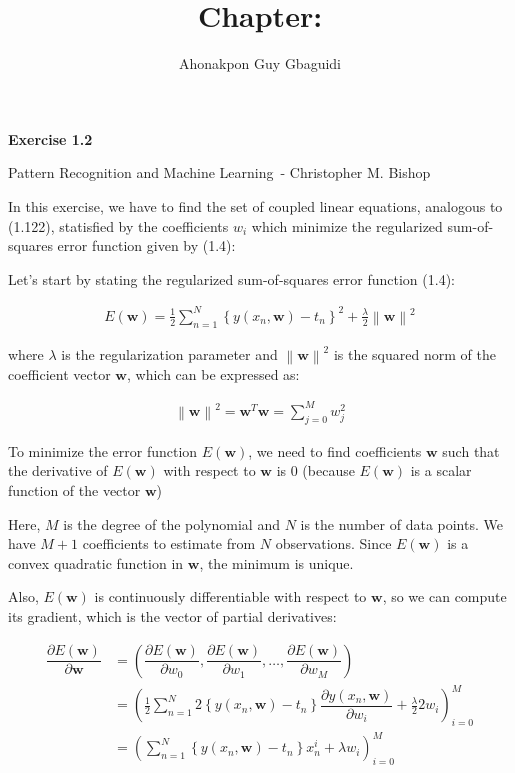\documentclass{article}
\title{Chapter: \ChapterName}
\author{Ahonakpon Guy Gbaguidi}
\date{}
\newcommand{\BookName}{Pattern Recognition and Machine Learning}
\newcommand{\BookAuthor}{Christopher M. Bishop}
\newcommand{\ExerciseID}{1.2}
\begin{document}
\maketitle

\begin{center}
  \large\textbf{Exercise \ExerciseID}

  \vspace{0.5em}

  \normalsize\BookName\ - \BookAuthor
\end{center}

\begin{tcolorbox}[breakable,colback=gray!5,colframe=gray!60,title=Solution]
In this exercise, we have to find the set of coupled linear equations, analogous
to (1.122), statisfied by the coefficients $w_i$ which minimize the regularized sum-of-squares error function given by (1.4):

Let's start by stating the regularized sum-of-squares error function (1.4):

\begin{align*}
  E(\textbf{w}) = \frac{1}{2} \sum_{n=1}^N \left\{ y(x_n, \textbf{w}) - t_n \right\}^2 + \frac{\lambda}{2} \left\lVert \textbf{w} \right\rVert^2
\end{align*}

where $\lambda$ is the regularization parameter and $\left\lVert \textbf{w} \right\rVert^2$ is the squared norm of the coefficient vector $\textbf{w}$, which can be expressed as:

\begin{align*}
  \left\lVert \textbf{w} \right\rVert^2 = \textbf{w}^T \textbf{w} = \sum_{j=0}^M w_j^2
\end{align*}

To minimize the error function $E(\textbf{w})$, we need to find coefficients $\textbf{w}$ such that the derivative of $E(\textbf{w})$ with respect to $\textbf{w}$ is 0 (because $E(\textbf{w})$ is a scalar function of the vector $\textbf{w}$)

Here, $M$ is the degree of the polynomial and $N$ is the number of data points. We have $M+1$ coefficients to estimate from $N$ observations. Since $E(\textbf{w})$ is a convex quadratic function in $\textbf{w}$, the minimum is unique.

Also, $E(\textbf{w})$ is continuously differentiable with respect to $\textbf{w}$, so we can compute its gradient, which is the vector of partial derivatives:

\begin{align*}
  \dfrac{\partial E(\textbf{w})}{\partial \textbf{w}} &= \left( \dfrac{\partial E(\textbf{w})}{\partial w_0}, \dfrac{\partial E(\textbf{w})}{\partial w_1}, \ldots, \dfrac{\partial E(\textbf{w})}{\partial w_M} \right) \\
  &= \left( \frac{1}{2} \sum_{n=1}^N 2 \left\{ y(x_n, \textbf{w}) - t_n \right\} \dfrac{\partial y(x_n, \textbf{w})}{\partial w_i} + \frac{\lambda}{2} 2 w_i \right)_{i=0}^{M} \\
  &= \left( \sum_{n=1}^N \left\{ y(x_n, \textbf{w}) - t_n \right\} x_n^i + \lambda w_i \right)_{i=0}^{M}
\end{align*}


\end{tcolorbox}
\end{document}
